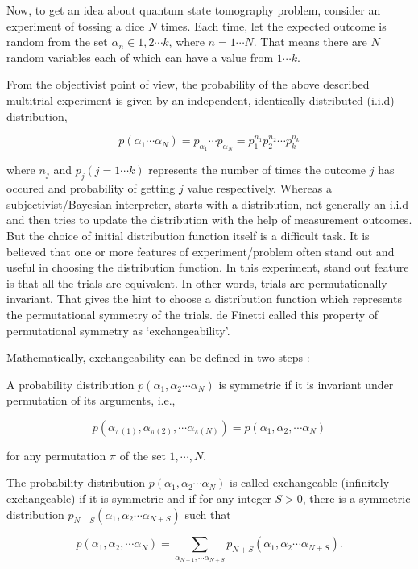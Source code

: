 Now, to get an idea about quantum state tomography problem, consider an experiment of tossing a dice $N$ times. Each time, let the expected outcome is random from the set $\alpha_{n} \in 1, 2 \cdots k$, where $n = 1 \cdots N$. That means there are $N$ random variables each of which can have a value from $1 \cdots k$.

From the objectivist point of view, the probability of the above described multitrial experiment is given by an independent, identically distributed (i.i.d) distribution,

$$
p(\alpha_{1} \cdots \alpha_{N}) = p_{\alpha_{1}} \cdots p_{\alpha_{N}} = p_{1}^{n_{1}} p_{2}^{n_{2}} \cdots p_{k}^{n_{k}}
$$ 

where $n_{j}$ and $p_{j} (j= 1 \cdots k)$ represents the number of times the outcome $j$ has occured and probability of getting $j$ value respectively. Whereas a  subjectivist/Bayesian interpreter, starts with a distribution, not generally an i.i.d and then tries to update the distribution with the help of measurement outcomes. But the choice of initial distribution function itself is a difficult task. It is believed that one or more features of experiment/problem often stand out and useful in choosing the distribution function. In this experiment, stand out feature is that all the trials are equivalent. In other words, trials are permutationally invariant. That gives the hint to choose a distribution function which represents the permutational symmetry of the trials. de Finetti called this property of permutational symmetry as `exchangeability'.

Mathematically, exchangeability can be defined in two steps :

A probability distribution $p(\alpha_{1}, \alpha_{2} \cdots \alpha_{N} )$ is symmetric if it is invariant under permutation of its arguments, i.e., 

$$ 
p(\alpha_{\pi(1)}, \alpha_{\pi(2)}, \cdots \alpha_{\pi(N)}) = p (\alpha_{1}, \alpha_{2}, \cdots \alpha_{N})
$$ 

for any permutation $\pi$ of the set $1, \cdots ,N$.

The probability distribution $p(\alpha_{1}, \alpha_{2} \cdots \alpha_{N})$ is called exchangeable (infinitely exchangeable) if it is symmetric and if for any integer $S > 0$, there is a symmetric distribution $p_{N+S} (\alpha_{1}, \alpha_{2} \cdots \alpha_{N+S})$ such that
 
$$ 
p(\alpha_{1}, \alpha_{2}, \cdots \alpha_{N}) = \sum_{\alpha_{N+1},\cdots \alpha_{N+S}} p_{N+S} (\alpha_{1}, \alpha_{2} \cdots \alpha_{N+S}).
$$

